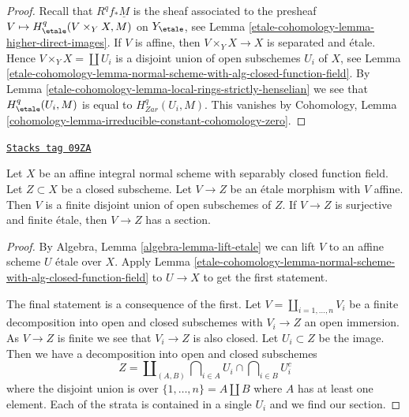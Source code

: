 \begin{proof}
Recall that $R^qf_*\underline{M}$ is the sheaf associated
to the presheaf $V \mapsto H^q_\etale(V \times_Y X, M)$ on $Y_\etale$, see
Lemma \ref{etale-cohomology-lemma-higher-direct-images}.
If $V$ is affine, then $V \times_Y X \to X$ is separated and \'etale.
Hence $V \times_Y X = \coprod U_i$ is a disjoint union of open
subschemes $U_i$ of $X$, see
Lemma \ref{etale-cohomology-lemma-normal-scheme-with-alg-closed-function-field}.
By Lemma \ref{etale-cohomology-lemma-local-rings-strictly-henselian}
we see that $H^q_\etale(U_i, M)$ is equal to
$H^q_{Zar}(U_i, M)$. This vanishes by
Cohomology, Lemma \ref{cohomology-lemma-irreducible-constant-cohomology-zero}.
\end{proof}

\begin{lemma}
\label{etale-cohomology-lemma-closed-of-affine-normal-scheme-with-alg-closed-function-field}
\href{https://stacks.math.columbia.edu/tag/09ZA}{\texttt{Stacks tag 09ZA}}

Let $X$ be an affine integral normal scheme with separably closed
function field. Let $Z \subset X$ be a closed subscheme. Let
$V \to Z$ be an \'etale morphism with $V$ affine. Then $V$ is a finite
disjoint union of open subschemes of $Z$. If $V \to Z$ is
surjective and finite \'etale, then $V \to Z$ has a section.
\end{lemma}

\begin{proof}
By Algebra, Lemma \ref{algebra-lemma-lift-etale}
we can lift $V$ to an affine scheme $U$ \'etale over $X$.
Apply Lemma \ref{etale-cohomology-lemma-normal-scheme-with-alg-closed-function-field}
to $U \to X$ to get the first statement.

\medskip\noindent
The final statement is a consequence of the first.
Let $V = \coprod_{i = 1, \ldots, n} V_i$ be a finite
decomposition into open and
closed subschemes with $V_i \to Z$ an open immersion.
As $V \to Z$ is finite we see that $V_i \to Z$ is also closed.
Let $U_i \subset Z$ be the image. Then we have a decomposition
into open and closed subschemes
$$
Z =
\coprod\nolimits_{(A, B)}
\bigcap\nolimits_{i \in A} U_i \cap
\bigcap\nolimits_{i \in B} U_i^c
$$
where the disjoint union is over $\{1, \ldots, n\} = A \amalg B$
where $A$ has at least one element.
Each of the strata is contained in a single $U_i$ and
we find our section.
\end{proof}

